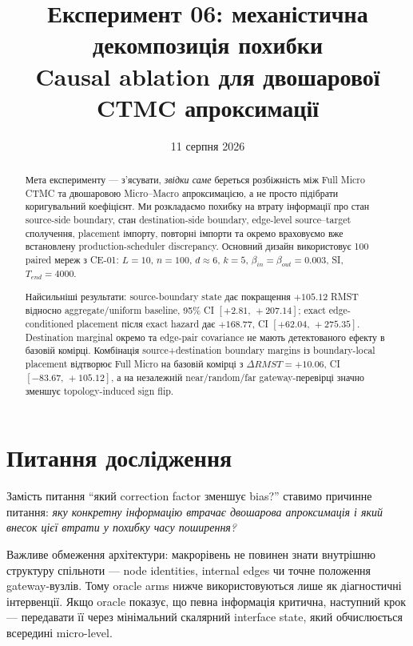 \documentclass[11pt,a4paper]{article}
\title{\textbf{Експеримент 06: механістична декомпозиція похибки}\\[0.35em]
\large Causal ablation для двошарової CTMC апроксимації}
\author{}
\date{11 серпня 2026}
\newcommand{\CI}[2]{[#1,\,#2]}
\begin{document}
\maketitle

\begin{abstract}
Мета експерименту --- з'ясувати, \emph{звідки саме} береться розбіжність між Full Micro CTMC та двошаровою Micro--Macro апроксимацією, а не просто підібрати коригувальний коефіцієнт. Ми розкладаємо похибку на втрату інформації про стан source-side boundary, стан destination-side boundary, edge-level source--target сполучення, placement імпорту, повторні імпорти та окремо враховуємо вже встановлену production-scheduler discrepancy. Основний дизайн використовує 100 paired мереж з CE-01: $L=10$, $n=100$, $d\approx6$, $k=5$, $\beta_{in}=\beta_{out}=0.003$, SI, $T_{end}=4000$.

Найсильніші результати: source-boundary state дає покращення $+105.12$ RMST відносно aggregate/uniform baseline, 95\% CI $\CI{+2.81}{+207.14}$; exact edge-conditioned placement після exact hazard дає $+168.77$, CI $\CI{+62.04}{+275.35}$. Destination marginal окремо та edge-pair covariance не мають детектованого ефекту в базовій комірці. Комбінація source+destination boundary margins із boundary-local placement відтворює Full Micro на базовій комірці з $\Delta RMST=+10.06$, CI $\CI{-83.67}{+105.12}$, а на незалежній near/random/far gateway-перевірці значно зменшує topology-induced sign flip.
\end{abstract}

\section{Питання дослідження}
Замість питання ``який correction factor зменшує bias?'' ставимо причинне питання: \emph{яку конкретну інформацію втрачає двошарова апроксимація і який внесок цієї втрати у похибку часу поширення?}

Важливе обмеження архітектури: макрорівень не повинен знати внутрішню структуру спільноти --- node identities, internal edges чи точне положення gateway-вузлів. Тому oracle arms нижче використовуються лише як діагностичні інтервенції. Якщо oracle показує, що певна інформація критична, наступний крок --- передавати її через мінімальний скалярний interface state, який обчислюється всередині micro-level.
\end{document}
